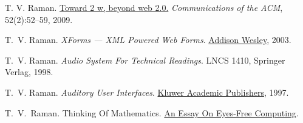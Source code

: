 \documentclass{article}
\begin{document}
\begin{compactitem}{}
 \item T. V. Raman.
\href{http://emacspeak.sourceforge.net/raman/publications/beyond-web20-cacm-2009/}{Toward 2 w, beyond web 2.0.}
 {\em Communications of the ACM}, 52(2):52--59, 2009.
\item  T.~V. Raman.  
 {\em XForms --- XML Powered Web Forms}.
 \href{http://www.amazon.com/exec/obidos/ASIN/0321154991}%
{Addison Wesley},  2003.
\item  T.~V. Raman.  
 {\em Audio System For Technical Readings}.  
{LNCS 1410}, Springer Verlag,  1998.
\item  T.~V. Raman.  
 {\em Auditory User Interfaces}.
 \href{http://www.cs.cornell.edu/home/raman/aui/aui.html}%
 {Kluwer Academic Publishers},  1997.
 \item T.~V.~Raman.
 Thinking Of Mathematics.
 \href{http://emacspeak.sourceforge.net/raman/publications/thinking-of-math/}{An Essay On Eyes-Free Computing}.


\end{compactitem}
\end{document}

